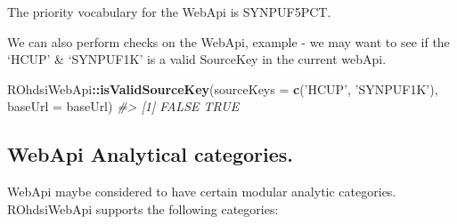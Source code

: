 \documentclass[
]{article}
\newenvironment{Shaded}{\begin{snugshade}}{\end{snugshade}}
\newcommand{\CommentTok}[1]{\textcolor[rgb]{0.56,0.35,0.01}{\textit{#1}}}
\newcommand{\DataTypeTok}[1]{\textcolor[rgb]{0.13,0.29,0.53}{#1}}
\newcommand{\KeywordTok}[1]{\textcolor[rgb]{0.13,0.29,0.53}{\textbf{#1}}}
\newcommand{\NormalTok}[1]{#1}
\newcommand{\OperatorTok}[1]{\textcolor[rgb]{0.81,0.36,0.00}{\textbf{#1}}}
\newcommand{\StringTok}[1]{\textcolor[rgb]{0.31,0.60,0.02}{#1}}
\begin{document}
The priority vocabulary for the WebApi is SYNPUF5PCT.

We can also perform checks on the WebApi, example - we may want to see
if the `HCUP' \& `SYNPUF1K' is a valid SourceKey in the current webApi.

\begin{Shaded}
\begin{Highlighting}[]

\NormalTok{ROhdsiWebApi}\OperatorTok{::}\KeywordTok{isValidSourceKey}\NormalTok{(}\DataTypeTok{sourceKeys =} \KeywordTok{c}\NormalTok{(}\StringTok{'HCUP'}\NormalTok{, }\StringTok{'SYNPUF1K'}\NormalTok{), }\DataTypeTok{baseUrl =}\NormalTok{ baseUrl)}
\CommentTok{#> [1] FALSE  TRUE}
\end{Highlighting}
\end{Shaded}

\hypertarget{webapi-analytical-categories.}{%
\subsection{WebApi Analytical
categories.}\label{webapi-analytical-categories.}}

WebApi maybe considered to have certain modular analytic categories.
ROhdsiWebApi supports the following categories:
\end{document}
